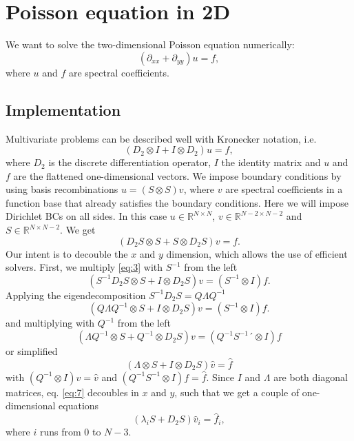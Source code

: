 \documentclass[10pt,a4paper]{article}
\begin{document}
\section*{Poisson equation in 2D}
We want to solve the two-dimensional Poisson equation numerically:
\begin{equation}
(\partial_{xx} + \partial_{yy}) u = f,
\end{equation}
where $u$ and $f$ are spectral coefficients. 

\subsection*{Implementation}
Multivariate problems can be described well with Kronecker notation, i.e.
\begin{equation}
(D_2 \otimes I + I \otimes D_2) u = f,
\end{equation}
where $D_2$ is the discrete differentiation operator, $I$ the identity matrix and $u$ and $f$ are the flattened one-dimensional vectors.
We impose boundary conditions by using basis recombinations $u=(S\otimes S)v$, where $v$ are spectral coefficients in a function base that already satisfies the boundary conditions. Here we will impose Dirichlet BCs on all sides. In this case $u\in\mathbb{R}^{N\times N}$, $v\in\mathbb{R}^{N-2\times N-2}$ and $S\in\mathbb{R}^{N\times N-2}$. We get
\begin{equation}
(D_2 S \otimes S + S \otimes D_2 S) v = f.
\label{eq:3}
\end{equation}
Our intent is to decouble the $x$ and $y$ dimension, which allows the use of efficient solvers. First, we multiply \eqref{eq:3} with $S^{-1}$ from the left
\begin{equation}
(S^{-1} D_2 S \otimes S + I \otimes D_2 S) v = (S^{-1}  \otimes I)f.
\label{eq:4}
\end{equation}
Applying the eigendecomposition $S^{-1} D_2 S = Q \Lambda Q^{-1}$
\begin{equation}
(Q \Lambda Q^{-1} \otimes S +  I \otimes D_2 S) v = (S^{-1}  \otimes I)f.
\label{eq:5}
\end{equation}
and multiplying with $Q^{-1}$ from the left
\begin{equation}
(\Lambda Q^{-1} \otimes S +  Q^{-1} \otimes D_2 S) v = (Q^{-1} S^{-1}´  \otimes I)f
\label{eq:6}
\end{equation}
or simplified
\begin{equation}
(\Lambda \otimes S +   I \otimes D_2 S) \widehat{v} = \widehat{f}
\label{eq:7}
\end{equation}
with $(Q^{-1} \otimes I) v = \widehat{v}$ and $(Q^{-1} S^{-1}  \otimes I)f = \widehat{f}$. Since $I$ and $\Lambda$ are both diagonal matrices, eq. \eqref{eq:7} decoubles in $x$ and $y$, such that we get a couple of one-dimensional equations
\begin{equation}
(\lambda_i S + D_2 S) \widehat{v}_i = \widehat{f}_i,
\label{eq:8}
\end{equation}
where $i$ runs from $0$ to $N-3$.\\
\end{document}
